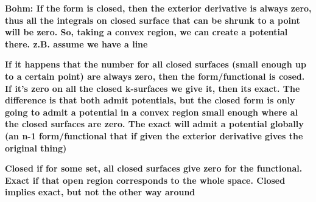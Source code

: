 \documentclass{book}
\begin{document}
\textbf{Bohm: If the form is closed, then the exterior derivative is always zero, thus all the integrals on closed surface that can be shrunk to a point will be zero. So, taking a convex region, we can create a potential there. z.B. assume we have a line}

\textbf{If it happens that the number for all closed surfaces (small enough up to a certain point) are always zero, then the form/functional is cosed. If it's zero on all the closed k-surfaces we give it, then its exact. The difference is that both admit potentials, but the closed form is only going to admit a potential in a convex region small enough where al the closed surfaces are zero. The exact will admit a potential globally (an n-1 form/functional that if given the exterior derivative gives the original thing)}

\textbf{Closed if for some set, all closed surfaces give zero for the functional. Exact if that open region corresponds to the whole space. Closed implies exact, but not the other way around}
\end{document}
